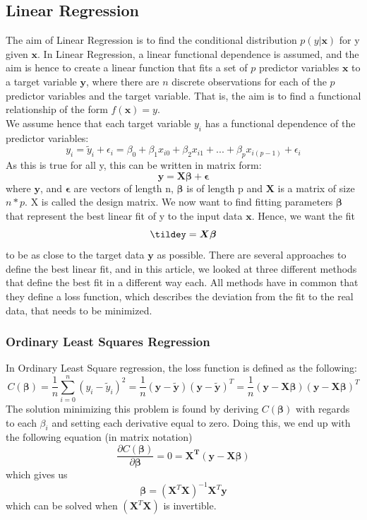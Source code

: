 \documentclass[11pt,a4paper]{article}
\begin{document}
\subsection{Linear Regression}
The aim of Linear Regression is to find the conditional distribution $p(y|\bm{x})$ for y given $\bm{x}$. In Linear Regression, a linear functional dependence is assumed, and the aim is hence to create a linear function that fits a set of $p$ predictor variables $\bm{x}$ to a target variable $\bm{y}$, where there are $n$ discrete observations for each of the $p$ predictor variables and the target variable. That is, the aim is to find a functional relationship of the form $f(\bm{x})=y$. \\
We assume hence that each target variable $y_i$ has a functional dependence of the predictor variables:
\begin{equation*}
y_i= \tilde y_i+\epsilon_i=\beta_0 + \beta_1x_{i0} + \beta_2x_{i1}+...+\beta_px_{i(p-1)} + \epsilon_i
\end{equation*}
As this is true for all y, this can be written in matrix form:
\begin{equation*}
\bm{y}= \bm{X\beta} + \bm{\epsilon}
\end{equation*}
where $\bm{y}$, and $\bm{\epsilon}$ are vectors of length n,  $\bm{\beta}$ is of length p and $\bm{X}$ is a matrix of size $n*p$. X is called the design matrix.
 We now want to find fitting parameters $\bm{\beta}$ that represent the best linear fit of y to the input data $\bm{x}$. Hence, we want the fit
 \begin{equation*}
 \bm{\tildey}= \bm{X\beta}
 \end{equation*}
 to be as close to the target data $\bm{y}$ as possible.
  There are several approaches to define the best linear fit, and in this article, we looked at three different methods that define the best fit in a different way each. All methods have in common that they define a loss function, which describes the deviation from the fit to the real data, that needs to be minimized.
\subsubsection{Ordinary Least Squares Regression}
In Ordinary Least Square regression, the loss function is defined as the following:
\begin{equation*}
C(\bm{\beta})= \frac{1}{n}\sum_{i=0}^n\left( y_i-\tilde y_i \right)^2
=\frac{1}{n}(\bm{y}-\bm{\tilde y})(\bm{y}-\bm{\tilde y})^T=
\frac{1}{n}(\bm{y}-\bm{X\beta})(\bm{y}-\bm{X\beta})^T
\end{equation*}
The solution minimizing this problem is found by deriving $C(\bm{\beta})$ with regards to each $\beta_i$ and setting each derivative equal to zero. Doing this, we end up with the following equation (in matrix notation)
\begin{equation*}
\frac{\partial C(\bm{\beta})}{\partial\bm{\beta}}=0=\bm{X^T}(\bm{y}-\bm{X\beta})
\end{equation*}
which gives us
\begin{equation*}
\bm{\beta}=(\bm{X}^T\bm{X})^{-1}\bm{X}^T\bm{y}
\end{equation*}
which can be solved when $(\bm{X}^T\bm{X})$ is invertible.
\end{document}
